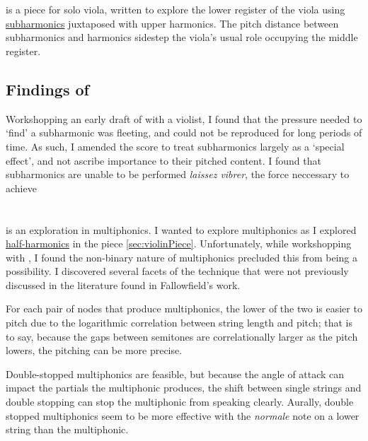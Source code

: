 \section{\violaPiece} \label{sec:violaPiece}
\violaPiece is a piece for solo viola, written to explore the lower register of the viola using \hyperref[sec:subharmonicsDiscussion]{subharmonics} juxtaposed with upper harmonics. 
The pitch distance between subharmonics and harmonics sidestep the viola's usual role occupying the middle register.



\subsection{Findings of \violaPiece}
Workshopping an early draft of \violaPiece with a violist, I found that the pressure needed to `find' a subharmonic was fleeting, and could not be reproduced for long periods of time.
As such, I amended the score to treat subharmonics largely as a `special effect', and not ascribe importance to their pitched content.
I found that subharmonics are unable to be performed \emph{laissez vibrer}, the force neccessary to achieve 


\section{\celloPiece} \label{sec:celloPiece}

\celloPiece is an exploration in multiphonics. 
I wanted to explore multiphonics as I explored \hyperref[sec:half-harmonics]{half-harmonics} in the piece \autoref{sec:violinPiece}.
Unfortunately, while workshopping with \celloParticipant, I found the non-binary nature of multiphonics precluded this from being a possibility.
I discovered several facets of the technique that were not previously discussed in the literature found in Fallowfield's work.\autocite[]{fallowfieldCelloMap}

For each pair of nodes that produce multiphonics, the lower of the two is easier to pitch due to the logarithmic correlation between string length and pitch;
that is to say, because the gaps between semitones are correlationally larger as the pitch lowers, the pitching can be more precise.

Double-stopped multiphonics are feasible, but because the angle of attack can impact the partials the multiphonic produces, the shift between single strings and double stopping can stop the multiphonic from speaking clearly.
Aurally, double stopped multiphonics seem to be more effective with the \emph{normale} note on a lower string than the multiphonic.




